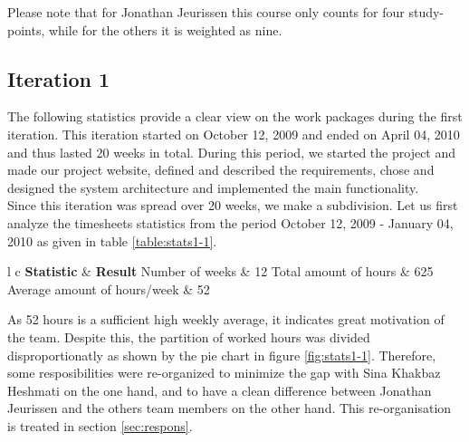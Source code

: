 \documentclass[salesmen, twoside]{../../../templates/latex/2009/softproj}
\begin{document}
\begin{projdoc}
			Please note that for Jonathan Jeurissen this course only counts for four study-points, while for the others 
			it is weighted as nine.
			
			\subsection{Iteration 1}
			
			The following statistics provide a clear view on the work packages during the first iteration. 
			This iteration started on October 12, 2009 and ended on April 04, 2010 and thus lasted 20 weeks in total. 
			During this period, we started the project and made our project website,
			defined and described the requirements, chose and designed the system architecture and 
			implemented the main functionality. \\
			
			Since this iteration was spread over 20 weeks, we make a subdivision. Let us first analyze 
			the timesheets statistics from the period October 12, 2009 - January 04, 2010 as given in
			table \ref{table:stats1-1}. \\
			
			\begin{table}
				\begin{center}
			\begin{tabular}{l c}
				\FL \textbf{Statistic} & \textbf{Result}
				\ML Number of weeks & 12
				\NN Total amount of hours  & 625
				\NN Average amount of hours/week & 52
			\end{tabular}
			\caption{General statistics for period 12/10/09 - 04/01/10 (1st semester).}
			\label{table:stats1-1}
			\end{center}
			\end{table}
			
			As 52 hours is a sufficient high weekly average, it indicates great motivation of the team.
			Despite this, the partition of worked hours was divided disproportionatly as shown by the pie chart in
			figure \ref{fig:stats1-1}. 
			Therefore, some resposibilities were re-organized to minimize the gap with Sina Khakbaz Heshmati
			on the one hand, 
			and to have a clean difference between Jonathan Jeurissen and the others team members on the other hand. 
			This re-organisation is treated in section \ref{sec:respons}. \\
			

\end{projdoc}
\end{document}
